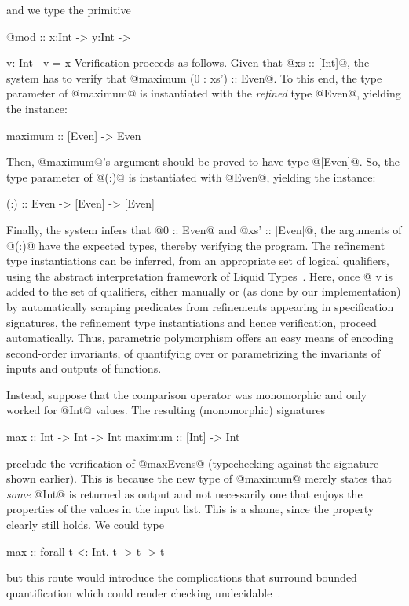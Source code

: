 \cite{z3} and we type the primitive {@mod :: x:Int -> y:Int -> {v: Int | v = x %
Verification proceeds as follows.
Given that {@xs :: [Int]@}, the system has to verify that
{@maximum (0 : xs') :: Even@}.
%
To this end, the type parameter of @maximum@ is instantiated with the 
\emph{refined} type @Even@, yielding the instance:
%
\begin{code}
  maximum :: [Even] -> Even
\end{code}
%
Then, @maximum@'s argument should be proved to have type
{@[Even]@}.
So, the type parameter of @(:)@ 
is instantiated with {@Even@}, yielding the instance: 
%
\begin{code}
  (:) :: Even -> [Even] -> [Even]
\end{code}
%
Finally, the system infers that {@0 :: Even@} and {@xs' :: [Even]@}, 
\ie the arguments of {@(:)@} have the expected types, thereby verifying
the program.
%
The refinement type instantiations can be inferred,
from an appropriate set of logical qualifiers, 
using the abstract interpretation framework of Liquid
Types~\cite{LiquidPLDI08}.
Here, once 
@ v%
is added to the set of qualifiers, either manually or (as done by 
our implementation) by automatically scraping predicates from 
refinements appearing in specification signatures, the 
refinement type instantiations and hence verification, proceed 
automatically.
%
Thus, parametric polymorphism offers an easy means of encoding 
second-order invariants, \ie of quantifying over or parametrizing 
the invariants of inputs and outputs of functions. 

Instead, suppose that the comparison operator was monomorphic and only
worked for @Int@ values. The resulting (monomorphic) signatures
\begin{code}
  max     :: Int -> Int -> Int
  maximum :: [Int] -> Int
\end{code}
preclude the verification of @maxEvens@ (\ie typechecking against the 
signature shown earlier). This is because the new type of @maximum@ 
merely states that \emph{some} @Int@  is returned as output and not 
necessarily one that enjoys the properties of the values in the input
list. This is a shame, since the property clearly still holds.
We could type
\begin{code}
  max :: forall t <: Int. t -> t -> t
\end{code}
but this route would introduce the complications
that surround bounded quantification which could render checking 
undecidable~\cite{piercebook}.

}}
